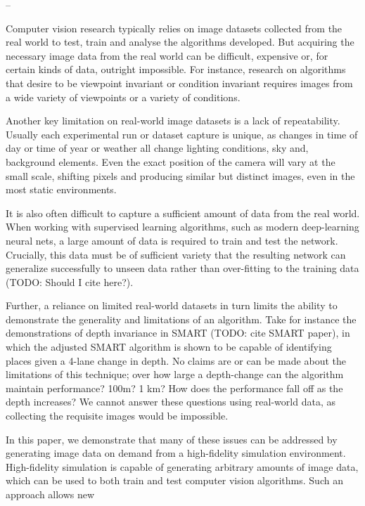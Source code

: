 --

Computer vision research typically relies on image datasets collected from the real world to test, train and analyse the algorithms developed. But acquiring the necessary image data from the real world can be difficult, expensive or, for certain kinds of data, outright impossible. For instance, research on algorithms that desire to be viewpoint invariant or condition invariant requires images from a wide variety of viewpoints or a variety of conditions. 

Another key limitation on real-world image datasets is a lack of repeatability. Usually each experimental run or dataset capture is unique, as changes in time of day or time of year or weather all change lighting conditions, sky and, background elements. Even the exact position of the camera will vary at the small scale, shifting pixels and producing similar but distinct images, even in the most static environments.

It is also often difficult to capture a sufficient amount of data from the real world. When working with supervised learning algorithms, such as modern deep-learning neural nets, a large amount of data is required to train and test the network. Crucially, this data must be of sufficient variety that the resulting network can generalize successfully to unseen data rather than over-fitting to the training data (TODO: Should I cite here?).

Further, a reliance on limited real-world datasets in turn limits the ability to demonstrate the generality and limitations of an algorithm. Take for instance the demonstrations of depth invariance in SMART (TODO: cite SMART paper), in which the adjusted SMART algorithm is shown to be capable of identifying places given a 4-lane change in depth. No claims are or can be made about the limitations of this technique; over how large a depth-change can the algorithm maintain performance? 100m? 1 km? How does the performance fall off as the depth increases? We cannot answer these questions using real-world data, as collecting the requisite images would be impossible.

In this paper, we demonstrate that many of these issues can be addressed by generating image data on demand from a high-fidelity simulation environment. High-fidelity simulation is capable of generating arbitrary amounts of image data, which can be used to both train and test computer vision algorithms. Such an approach allows new 